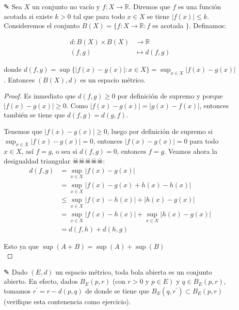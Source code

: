 \begin{itemize}
\begin{proof}
    \end{proof}

 

    \item[✎]Sea $X$ un conjunto no vacío y $f: X \rightarrow \mathbb{R}$. Diremos que $f$ es una función acotada si existe $k>0$ tal que para todo $x \in X$ se tiene $|f(x)| \leq k$. Consideremos el conjunto $B(X)=\{f: X \rightarrow \mathbb{R}: f$ es acotada $\}$. Definamos:

        $$
        \begin{aligned}
        d: B(X) \times B(X) & \rightarrow \mathbb{R} \\
        (f, g) & \mapsto d(f, g)
        \end{aligned}
        $$

        donde $d(f, g)=\sup \{|f(x)-g(x)|: x \in X\}=\sup _{x \in X}|f(x)-g(x)|$. Entonces $(B(X), d)$ es un espacio métrico.\\

        \begin{proof}
            Es inmediato que $d(f,g)\geq 0$ por definición de supremo y porque $|f(x)-g(x)|\geq 0$. Como $|f(x)-g(x)|=|g(x)-f(x)|$, entonces también se tiene que $d(f,g)=d(g,f)$.

            Tenemos que $|f(x)-g(x)|\geq 0$, luego por definición de supremo si $\sup_{x \in X}|f(x)-g(x)|=0$, entonces $|f(x)-g(x)|=0$ para todo $x\in X$, así $f=g$, o sea si $d(f,g)=0$, entonces $f=g$. Veamos ahora la desigualdad triangular ☠☠☠☠☠:
            \begin{align*}
                d(f,g)&=\sup_{x\in X}|f(x)-g(x)|\\
                &=\sup_{x\in X}|f(x)-g(x)+h(x)-h(x)|\\
                &\leq \sup_{x\in X}|f(x)-h(x)|+|h(x)-g(x)|\\
                &=\sup_{x\in X}|f(x)-h(x)|+\sup_{x\in X}|h(x)-g(x)|\\
                &=d(f,h)+d(h,g)
            \end{align*}

            Esto ya que $\sup (A+B)=\sup(A)+\sup (B)$\\
            
        \end{proof}

        \item[✎] Dado $(E, d)$ un espacio métrico, toda bola abierta es un conjunto abierto. En efecto, dados $B_E(p, r)$ (con $r>0$ y $\left.p \in E\right)$ y $q \in B_E(p, r)$, tomamos $r^{\prime}=r-d(p, q)$ de donde se tiene que $B_E\left(q, r^{\prime}\right) \subset B_E(p, r)$ (verifique esta contenencia como ejercicio).


\end{itemize}
